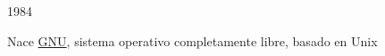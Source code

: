 \documentclass[hyperref={colorlinks}]{beamer}
\begin{document}
\begin{frame}
\begin{minipage}{.55\linewidth}
\begin{block}{1984}
\begin{minipage}{.2\linewidth}
        \end{minipage}
        \begin{minipage}{.75\linewidth}
        Nace \href{https://es.wikipedia.org/wiki/GNU}{GNU}, sistema operativo completamente libre, basado en Unix
        \end{minipage}
    \end{block}
    \end{minipage}
\end{frame}
\end{document}
